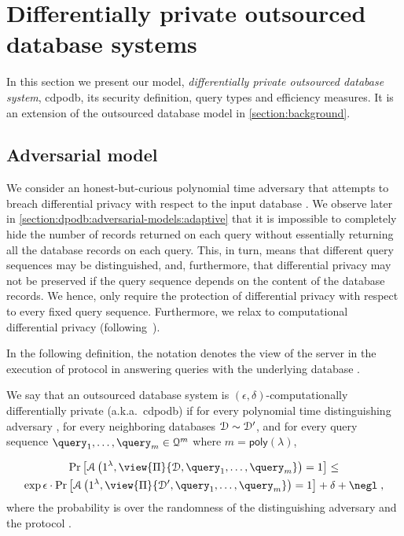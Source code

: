 \section{Differentially private outsourced database systems}\label{section:dpodb}

	In this section we present our model, \emph{differentially private outsourced database system}, \acrshort{cdpodb}, its security definition, query types and efficiency measures.
	It is an extension of the outsourced database model in \cref{section:background}.

	\subsection{Adversarial model}\label{section:dpodb:adversarial-models}

		We consider an honest-but-curious polynomial time adversary that attempts to breach differential privacy with respect to the input database \database{}.
		We observe later in \cref{section:dpodb:adversarial-models:adaptive} that it is impossible to completely hide the number of records returned on each query without essentially returning all the database records on each query.
		This, in turn, means that different query sequences may be distinguished, and, furthermore, that differential privacy may not be preserved if the query sequence depends on the content of the database records.
		We hence, only require the protection of differential privacy with respect to every fixed query sequence.
		Furthermore, we relax to computational differential privacy (following~\cite{computational-dp}).

		In the following definition, the notation  denotes the view of the server \server{} in the execution of protocol \protocol{} in answering queries  with the underlying database \database{}.

		\begin{definition}
			We say that an outsourced database system \protocol{} is $(\epsilon, \delta)$-computationally differentially private (a.k.a.~\acrshort{cdpodb}) if for every polynomial time distinguishing adversary \adversary{}, for every neighboring databases $\mathcal{D} \sim \mathcal{D}^\prime$, and for every query sequence $\fromNtoM{\query}{1}{m} \in \querySet^m$ where $m = \mathsf{poly}(\lambda)$,

			\begin{multline*}
				\probability{\adversary \left( 1^\lambda, \view{\protocol{}}{\database, \fromNtoM{\query}{1}{m}} \right) = 1 } \leq \\
				\exp{\epsilon} \cdot \probability{\adversary \left( 1^\lambda, \view{\protocol{}}{\database^\prime, \fromNtoM{\query}{1}{m}} \right) = 1} + \delta +\negl \; ,
			\end{multline*}
			where the probability is over the randomness of the distinguishing adversary \adversary{} and the protocol \protocol{}.
		\end{definition}

